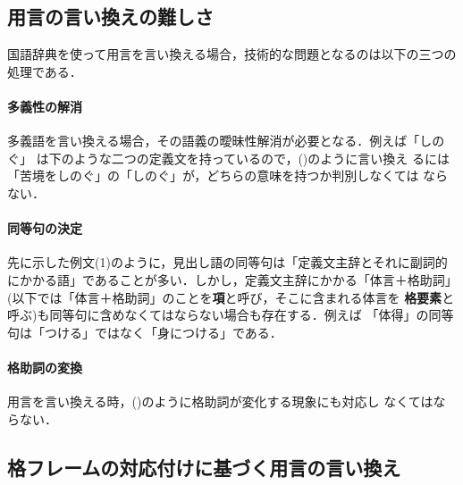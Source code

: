 \subsection{用言の言い換えの難しさ}

国語辞典を使って用言を言い換える場合，技術的な問題となるのは以下の三つの
処理である．

\paragraph{多義性の解消}

多義語を言い換える場合，その語義の曖昧性解消が必要となる．例えば「しのぐ」
は下のような二つの定義文を持っているので，(\theparactr)のように言い換え
るには「苦境をしのぐ」の「しのぐ」が，どちらの意味を持つか判別しなくては
ならない．




\paragraph{同等句の決定}

先に示した例文(1)のように，見出し語の同等句は「定義文主辞とそれに副詞的
にかかる語」であることが多い．しかし，定義文主辞にかかる「体言＋格助詞」
(以下では「体言＋格助詞」のことを{\bf 項}と呼び，そこに含まれる体言を
{\bf 格要素}と呼ぶ)も同等句に含めなくてはならない場合も存在する．例えば
「体得」の同等句は「つける」ではなく「身につける」である．



\newpage

\paragraph{格助詞の変換}

用言を言い換える時，(\theparactr)のように格助詞が変化する現象にも対応し
なくてはならない．




\subsection{格フレームの対応付けに基づく用言の言い換え}

